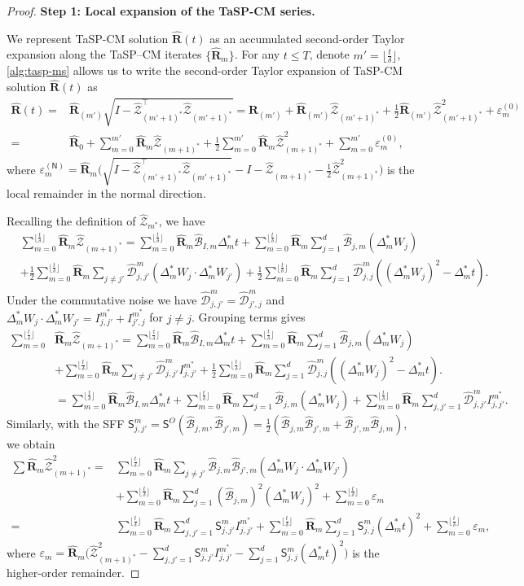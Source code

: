 \documentclass[11pt, a4paper, onecolumn]{article}
\renewcommand{\SS}{\mathsf{S}}
\newcommand{\m}{m}
\newcommand{\SSO}{\nm S^{O}}
\newcommand{\bfR}{\mathbf{R}}
\newcommand{\Z}{\mathcal{Z}}
\newcommand{\B}{\mathcal{B}}
\newcommand{\hatB}{\widehat{\B}}
\newcommand{\hatZ}{\widehat{\Z}}
\newcommand{\hatR}{\widehat{\bfR}}
\newcommand{\hatD}{\widehat{\tg D}}
\newcommand{\tg}[1]{\mathcal{#1}}
\newcommand{\nm}[1]{\mathsf{#1}}
\newcommand{\ms}{{m^*}}
\newcommand{\mos}{{(m+1)^*}}
\newcommand{\hBIms}{{\hatB_{I,\m}}}
\newcommand{\hBjms}{{\hatB_{j,\m}}}
\newcommand{\hBjpms}{{\hatB_{j',\m}}}
\newcommand{\Dms}{{\Delta^{*}_{m}}}
\newcommand{\hDjjms}{ {\hatD_{j,j}^{\m}} }
\newcommand{\hDjjpms}{ {\hatD_{j,j'}^{\m}} }
\newcommand{\hDjpjms}{ {\hatD_{j',j}^{\m}} }
\newcommand{\Ijjpms}{ {I_{j,j'}^{\ms}} }
\newcommand{\Ijpjms}{ {I_{j',j}^{\ms}} }
\newcommand{\sumub}{{\lfloor \frac{t}{\delta} \rfloor}}
\newcommand{\hZms}{ \hatZ_{\ms} }
\newcommand{\hZmos}{ \hatZ_{\mos} }
\newcommand{\hZmpos}{ \hatZ_{(m'+1)^*} }
\newcommand{\half}{{\frac{1}{2}}}
\newcommand{\hRms}{{\hatR_\m}}
\newcommand{\hRmps}{{\hatR_{(m')}}}
\newcommand{\ermn}[1]{\varepsilon_m^{(#1)}}
\begin{document}
\begin{appendices}
\begin{proof}
\noindent\textbf{Step 1: Local expansion of the TaSP-CM series.}  


We represent TaSP-CM solution $\hatR(t)$ as an accumulated second-order Taylor expansion along the TaSP–CM iterates $\{\hRms\}$. For any $t\le T$, denote $m'=\sumub$, \cref{alg:tasp-ms} allows us to write the second-order Taylor expansion of TaSP-CM solution $\hatR(t)$ as
\begin{align*}
    \hatR(t) = & \hRmps\sqrt{I-\hZmpos^{\top}\hZmpos} = \hRmps + \hRmps \hZmpos + \half \hRmps \hZmpos^2 + \ermn{0} \\
              = & \hatR_0 + \sum_{m=0}^{m'} \hRms \hZmos + \half \sum_{m=0}^{m'} \hRms \hZmos^2 + \sum_{m=0}^{m'}  \ermn{0},
\end{align*} where $\ermn{\nm N} =\hRms\Big(\sqrt{I-\hZmpos^{\top}\hZmpos} -I - \hZmos - \half  \hZmos^2\Big)$ is the local remainder in the normal direction. 

Recalling the definition of $\hZms$, we have
\begin{align*}
     &\sum_{m=0}^{\sumub}  \hRms \hZmos =  \sum_{m=0}^{\sumub} \hRms \hBIms \Dms t + \sum_{m=0}^{\sumub} \hRms \sum_{j=1}^d\hBjms (\Dms W_j) \\
                 \nonumber & + \half \sum_{m=0}^{\sumub} \hRms \sum_{j \neq j'} \hDjjpms (\Dms W_j \cdot \Dms W_{j'})+ \half \sum_{m=0}^{\sumub} \hRms \sum_{j=1}^d\hDjjms \left( (\Dms W_j)^2 - \Dms t \right).
\end{align*}
Under the commutative noise we have $\hDjjpms = \hDjpjms$ and $\Dms W_j \cdot \Dms W_{j'} = \Ijjpms + \Ijpjms$ for $j\neq j$. Grouping terms gives
\begin{align}\label{eq:z1}
    \nonumber \sum_{m=0}^{\sumub} & \hRms \hZmos  = \sum_{m=0}^{\sumub} \hRms \hBIms \Dms t + \sum_{m=0}^{\sumub} \hRms \sum_{j=1}^d\hBjms  (\Dms W_j)  \\ 
    & +\sum_{m=0}^{\sumub} \hRms \sum_{j \neq j'} \hDjjpms \Ijjpms+ \half \sum_{m=0}^{\sumub} \hRms \sum_{j=1}^d\hDjjms \left( (\Dms W_j)^2 - \Dms t \right). \nonumber \\ 
    & = \sum_{m=0}^{\sumub}  \hRms \hBIms \Dms t + \sum_{m=0}^{\sumub} \hRms \sum_{j=1}^d\hBjms  (\Dms W_j) + \sum_{m=0}^{\sumub} \hRms \sum_{j,j'=1}^d \hDjjpms \Ijjpms.
\end{align}
Similarly, with the SFF $\SS_{j,j'}^m = \SSO(\hBjms,\hBjpms) = \half (\hBjms\hBjpms +\hBjpms\hBjms)$, we obtain
\begin{align}\label{eq:z2} 
     \sum \hRms \hZmos^2 =  & \sum_{m=0}^{\sumub} \hRms \sum_{j\neq j'} \hBjms\hBjpms  (\Dms W_j \cdot \Dms W_{j'})    \nonumber  \\ 
      & + \sum_{m=0}^{\sumub} \hRms \sum_{j=1}^d(\hBjms)^2(\Dms W_j)^2  + \sum_{m=0}^{\sumub} \varepsilon_m \nonumber \\
    = &\sum_{m=0}^{\sumub} \hRms \sum_{j,j'=1}^d \SS_{j,j'}^m \Ijjpms + \sum_{m=0}^{\sumub} \hRms \sum_{j=1}^d\SS_{j,j}^m(\Dms t)^2  + \sum_{m=0}^{\sumub} \varepsilon_m,   
\end{align}
where $ \varepsilon_m =\hRms \Big(\hZmos^2 -  \sum_{j,j'=1}^d \SS_{j,j'}^m \Ijjpms - \sum_{j=1}^d\SS_{j,j}^m(\Dms t)^2\Big) $ is the higher-order remainder.


\end{proof}
\end{appendices}
\end{document}
